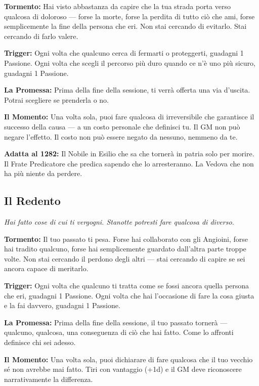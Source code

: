 \textbf{Tormento:} Hai visto abbastanza da capire che la tua strada
porta verso qualcosa di doloroso — forse la morte, forse la perdita
di tutto ciò che ami, forse semplicemente la fine della persona che
eri. Non stai cercando di evitarlo. Stai cercando di farlo valere.

\textbf{Trigger:} Ogni volta che qualcuno cerca di fermarti o
proteggerti, guadagni 1 Passione. Ogni volta che scegli il percorso
più duro quando ce n'è uno più sicuro, guadagni 1 Passione.

\textbf{La Promessa:} Prima della fine della sessione, ti verrà
offerta una via d'uscita. Potrai scegliere se prenderla o no.

\textbf{Il Momento:} Una volta sola, puoi fare qualcosa di
irreversibile che garantisce il successo della causa — a un costo
personale che definisci tu. Il GM non può negare l'effetto. Il costo
non può essere negato da nessuno, nemmeno da te.

\textbf{Adatta al 1282:} Il Nobile in Esilio che sa che tornerà
in patria solo per morire. Il Frate Predicatore che predica sapendo
che lo arresteranno. La Vedova che non ha più niente da perdere.

\filetto

\subsection{Il Redento}
\textit{Hai fatto cose di cui ti vergogni. Stanotte potresti fare qualcosa di diverso.}

\textbf{Tormento:} Il tuo passato ti pesa. Forse hai collaborato
con gli Angioini, forse hai tradito qualcuno, forse hai semplicemente
guardato dall'altra parte troppe volte. Non stai cercando il perdono
degli altri — stai cercando di capire se sei ancora capace di
meritarlo.

\textbf{Trigger:} Ogni volta che qualcuno ti tratta come se fossi
ancora quella persona che eri, guadagni 1 Passione. Ogni volta che
hai l'occasione di fare la cosa giusta e la fai davvero, guadagni
1 Passione.

\textbf{La Promessa:} Prima della fine della sessione, il tuo
passato tornerà — qualcuno, qualcosa, una conseguenza di ciò che
hai fatto. Come lo affronti definisce chi sei adesso.

\textbf{Il Momento:} Una volta sola, puoi dichiarare di fare
qualcosa che il tuo vecchio sé non avrebbe mai fatto. Tiri con
vantaggio (+1d) e il GM deve riconoscere narrativamente la differenza.

